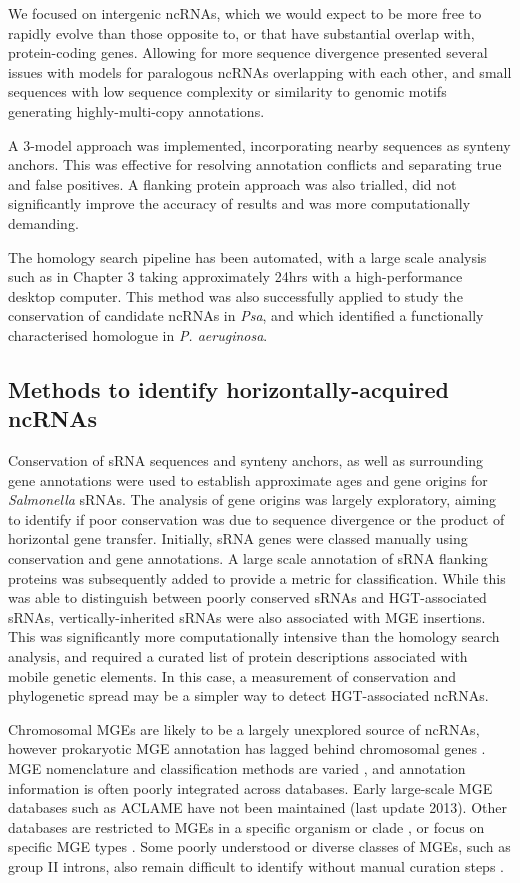 We focused on intergenic ncRNAs, which we would expect to be more free to rapidly evolve than those opposite to, or that have substantial overlap with, protein-coding genes. Allowing for more sequence divergence presented several issues with models for paralogous ncRNAs overlapping with each other, and small sequences with low sequence complexity or similarity to genomic motifs generating highly-multi-copy annotations.

A 3-model approach was implemented, incorporating nearby sequences as synteny anchors. This was effective for resolving annotation conflicts and separating true and false positives. A flanking protein approach was also trialled, did not significantly improve the accuracy of results and was more computationally demanding.

The homology search pipeline has been automated, with a large scale analysis such as in Chapter 3 taking approximately 24hrs with a high-performance desktop computer. This method was also successfully applied to study the conservation of candidate ncRNAs in \textit{Psa}, and which identified a functionally characterised homologue in \textit{P. aeruginosa}. 

\subsection{Methods to identify horizontally-acquired ncRNAs}

Conservation of sRNA sequences and synteny anchors, as well as surrounding gene annotations were used to establish approximate ages and gene origins for \textit{Salmonella} sRNAs. 
The analysis of gene origins was largely exploratory, aiming to identify if poor conservation was due to sequence divergence or the product of horizontal gene transfer. Initially, sRNA genes were classed manually using conservation and gene annotations. A large scale annotation of sRNA flanking proteins was subsequently added to provide a metric for classification. While this was able to distinguish between poorly conserved sRNAs and HGT-associated sRNAs, vertically-inherited sRNAs were also associated with MGE insertions. This was significantly more computationally intensive than the homology search analysis, and required a curated list of protein descriptions associated with mobile genetic elements. In this case, a measurement of conservation and phylogenetic spread may be a simpler way to detect HGT-associated ncRNAs.

Chromosomal MGEs are likely to be a largely unexplored source of ncRNAs, however prokaryotic MGE annotation has lagged behind chromosomal genes \citep{Frost2005-wt}. MGE nomenclature and classification methods are varied \citep{Piegu2015-dq}, and annotation information is often poorly integrated across databases. Early large-scale MGE databases such as ACLAME \citep{Leplae2010-zq} have not been maintained (last update 2013). Other databases are restricted to MGEs in a specific organism or clade \citep{Partridge2018-mh}, or focus on specific MGE types \citep{Arndt2016-hj}. Some poorly understood or diverse classes of MGEs, such as group II introns, also remain difficult to identify without manual curation steps \citep{Candales2012-ws}. 

